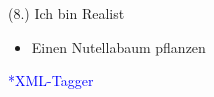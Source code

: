 \documentclass[12pt]{beamer}
\begin{document}
\begin{frame}{(8.) Ich bin Realist}
\begin{minipage}{0.6\textwidth}
\begin{itemize}
			\vspace*{0.6cm}			
			\item Einen Nutellabaum pflanzen
		\end{itemize}
		
	\vspace{0.3cm}\hspace{3.5cm}\textcolor{blue}{\footnotesize{*XML-Tagger}}
	\end{minipage}
\end{frame}
\end{document}
